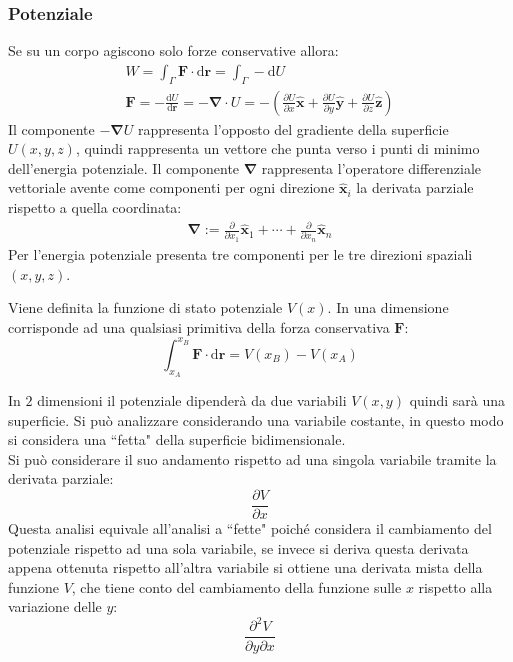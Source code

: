 \documentclass{article}
\newcommand{\vect}[1]{\boldsymbol{\mathbf{#1}}}
\newcommand{\df}{\mathrm{d}}
\numberwithin{equation}{subsection}
\begin{document}
\subsubsection{Potenziale}


Se su un corpo agiscono solo forze conservative allora:
\begin{gather*}
    W=\int_{\Gamma}\vect{F}\cdot \df\vect{r}=\int_{\Gamma}-\df U\\
    \vect{F}=-\displaystyle\frac{\df U}{\df\vect{r}}=-\vect{\nabla}\cdot U=-\left(\displaystyle\frac{\partial U}{\partial x}\hat{\vect{x}}+\frac{\partial U}{\partial y}\hat{\vect{y}}+\frac{\partial U}{\partial z}\hat{\vect{z}}\right)
\end{gather*} 
Il componente $-\vect{\nabla}U$ rappresenta l'opposto del gradiente della superficie $U(x,y,z)$, quindi rappresenta un vettore che punta verso i punti di minimo dell'energia 
potenziale. Il componente $\vect{\nabla}$ rappresenta l'operatore differenziale vettoriale avente come componenti per ogni direzione $\hat{\vect{x}}_i$ la derivata parziale rispetto 
a quella coordinata:
\begin{gather*}
    \vect{\nabla}:=\displaystyle\frac{\partial}{\partial x_1}\hat{\vect{x}}_1+\cdots+\frac{\partial}{\partial x_n}\hat{\vect{x}}_n
\end{gather*}
Per l'energia potenziale presenta tre componenti per le tre direzioni spaziali $(x,y,z)$. 


Viene definita la funzione di stato potenziale $V(x)$. In una dimensione corrisponde ad una qualsiasi primitiva della forza conservativa $\vect{F}$:
\begin{equation*}
    \displaystyle\int_{x_A}^{x_B}\vect{F}\cdot \df\vect{r}=V(x_B)-V(x_A)
\end{equation*}



In $2$ dimensioni il potenziale dipenderà da due variabili $V(x,y)$ 
quindi sarà una superficie. Si può analizzare considerando una 
variabile costante, in questo modo si 
considera una ``fetta" della superficie bidimensionale.
\\
Si può considerare il suo andamento rispetto ad una singola 
variabile tramite la derivata parziale: 
\begin{equation*}
    \displaystyle\frac{\partial V}{\partial x}
\end{equation*}
Questa analisi equivale all'analisi a ``fette" poiché 
considera il cambiamento del potenziale rispetto ad una sola variabile, se invece si deriva questa derivata 
appena ottenuta rispetto all'altra variabile si ottiene una derivata 
mista della funzione $V$, che tiene conto del cambiamento della 
funzione sulle $x$ rispetto alla variazione delle $y$: 
\begin{equation*}
    \displaystyle\frac{\partial^{2} V}{\partial y\partial x}
\end{equation*}
\end{document}

